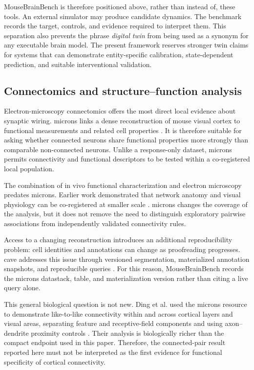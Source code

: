 MouseBrainBench is therefore positioned above, rather than instead of, these
tools. An external simulator may produce candidate dynamics. The benchmark
records the target, controls, and evidence required to interpret them. This
separation also prevents the phrase \emph{digital twin} from being used as a
synonym for any executable brain model. The present framework reserves stronger
twin claims for systems that can demonstrate entity-specific calibration,
state-dependent prediction, and suitable interventional validation.

\subsection{Connectomics and structure--function analysis}
\label{subsec:connectomics}

Electron-microscopy connectomics offers the most direct local evidence about
synaptic wiring. \acs{microns} links a dense reconstruction of mouse visual cortex to
functional measurements and related cell properties \citep{bae2025microns}.
It is therefore suitable for asking whether connected neurons share functional
properties more strongly than comparable non-connected neurons. Unlike a
response-only dataset, \acs{microns} permits connectivity and functional descriptors
to be tested within a co-registered local population.

The combination of in vivo functional characterization and electron microscopy
predates \acs{microns}. Earlier work demonstrated that network anatomy and visual
physiology can be co-registered at smaller scale \citep{bock2011network}.
\acs{microns} changes the coverage of the analysis, but it does not remove the need to
distinguish exploratory pairwise associations from independently validated
connectivity rules.

Access to a changing reconstruction introduces an additional reproducibility
problem: cell identities and annotations can change as proofreading progresses.
\ac{cave} addresses this issue through versioned segmentation, materialized
annotation snapshots, and reproducible queries \citep{dorkenwald2025cave}. For
this reason, MouseBrainBench records the \acs{microns} datastack, table, and
materialization version rather than citing a live query alone.

This general biological question is not new. Ding et al. used the \acs{microns}
resource to demonstrate like-to-like connectivity within and across cortical
layers and visual areas, separating feature and receptive-field components and
using axon--dendrite proximity controls \citep{ding2025wiring}. Their analysis
is biologically richer than the compact endpoint used in this paper. Therefore,
the connected-pair result reported here must not be interpreted as the first
evidence for functional specificity of cortical connectivity.

